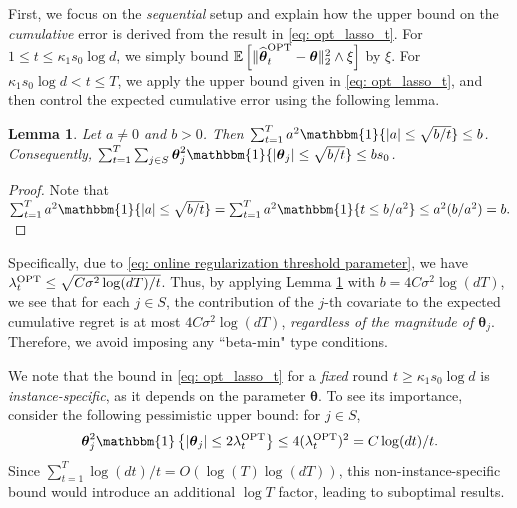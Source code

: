 \documentclass[aos,preprint]{imsart}
\theoremstyle{plain}
\newtheorem{lemma}[theorem]{Lemma}
\theoremstyle{definition}
\newcommand{\btheta}{\boldsymbol{\theta}}
\newcommand{\idf}{\mathbbm{1}}
\newcommand{\ptheta}{\widehat{\boldsymbol{\theta}}^{\textup{OPT}}}
\newcommand{\hdlambda}{\lambda^{\textup{OPT}}}
\newcommand{\Exp}{\mathbb{E}}
\begin{document}
First, we focus on the \textit{sequential} setup and explain how the upper bound on the \textit{cumulative} error is derived from the result in \eqref{eq: opt_lasso_t}. For $1 \leq t \leq \kappa_1 s_0\log d$, we simply bound $\Exp\left[\|\ptheta_t-\btheta \|_2^2 \wedge \xi\right]$ by $\xi$. For $\kappa_1 s_0\log d < t \leq T$, we apply the upper bound given in \eqref{eq: opt_lasso_t}, and then control the expected cumulative error using the following lemma.

\begin{lemma}\label{lemma: instance sum}
Let $a  \neq 0$ and $b > 0$. Then
$\sum_{t=1}^T a^2 \idf\{|a|\le \sqrt{b/t}\} \le b$. Consequently, 
$\sum_{t=1}^T \sum_{j\in S} \btheta_j^2\idf\{|\btheta_j|\le \sqrt{b/t}\} \le b s_0$.
\end{lemma}
\begin{proof} Note that
$\sum_{t=1}^T a^2\idf\{|a|\le \sqrt{b/t}\} = \sum_{t=1}^T a^2\idf\{t\le b/a^2\} \le a^2 (b/a^2) = b.$
\end{proof}
Specifically, due to \eqref{eq: online regularization threshold parameter}, we have $\hdlambda_t \leq \sqrt{C \sigma^2 \log(dT)/t}$. Thus,  by applying Lemma \ref{lemma: instance sum} with $b = 4C\sigma^2\log(dT)$, we see that for each $j \in S$, the contribution of the $j$-th covariate to the expected cumulative regret is at most $4C\sigma^2\log(dT)$, \textit{regardless of the magnitude of $\btheta_j$}. Therefore, we avoid imposing any ``beta-min" type conditions.

We note that the bound in \eqref{eq: opt_lasso_t} for a \textit{fixed} round $t \geq \kappa_1 s_0\log d$ is \textit{instance-specific}, as it depends on the parameter $\btheta$. To see its importance, consider the following pessimistic upper bound: for $j \in S$,
\begin{equation}\label{pess_bound}
    \btheta_j^2 \idf\left\{|\btheta_j| \le 2\hdlambda_t \right\} \leq 4 (\hdlambda_t)^2 = C \log(dt)/t.
\end{equation}
Since $\sum_{t=1}^{T}\log(dt)/t = O(\log(T)\log(dT))$, this non-instance-specific bound would introduce an additional $\log T$ factor, leading to suboptimal results.
\end{document}
